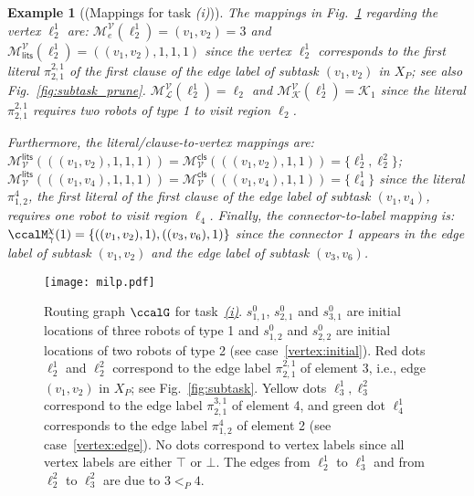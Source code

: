 \documentclass[Afour,sageh,times]{sagej}
\newtheorem{exmp}{Example}
\renewcommand{\ap}[3]{\mathcal{\pi}_{{#1},{#2}}^{#3}}
\newenvironment{cexmp}
{\addtocounter{exmp}{-1}\begin{exmp}}
  {\end{exmp}}
\begin{document}
\begin{cexmp}[(Mappings for task {\it (i)})]
    The mappings in Fig.~\ref{fig:milp} regarding the vertex $\ell_2^{1}$ are:
    $\mathcal{M}_e^{\mathcal{V}}(\ell_{2}^{1})  = (v_1,v_2) = 3$ and $\mathcal{M}_{\mathsf{lits}}^{\mathcal{V}}(\ell_{2}^{1})  = ((v_1,v_2), 1, 1, 1)$ since the vertex $\ell_2^{1}$ corresponds to the first literal $\ap{2}{1}{2,1}$ of the first clause of the edge label of subtask $(v_1, v_2)$ in $X_P$; see also Fig.~\ref{fig:subtask_prune}.  $\mathcal{M}_\mathcal{L}^{\mathcal{V}}(\ell_{2}^{1})  = \ell_2$  and $\mathcal{M}_\mathcal{K}^{\mathcal{V}}(\ell_{2}^{1})  = \mathcal{K}_1$ since the literal $\ap{2}{1}{2,1}$ requires two robots of type 1 to visit region $\ell_2$.

    Furthermore,  the literal/clause-to-vertex mappings are:
    $\mathcal{M}^{\mathsf{lits}}_{\mathcal{V}}(((v_1,v_2), 1, 1, 1)) = \mathcal{M}^{\mathsf{cls}}_{\mathcal{V}}(((v_1,v_2), 1, 1))  = \{\ell_2^{1}, \ell_2^{2}\}$; $\mathcal{M}^{\mathsf{lits}}_{\mathcal{V}}(((v_1,v_4), 1, 1, 1)) = \mathcal{M}^{\mathsf{cls}}_{\mathcal{V}}(((v_1,v_4), 1, 1))  = \{\ell_4^{1}\}$ since the literal $\ap{1}{2}{4}$, the first literal of the first clause of the edge label of subtask $(v_1, v_4)$, requires one robot to visit region $\ell_4$. Finally, the connector-to-label mapping is: $\ccalM^{\chi}_{\gamma} (1)  = \{((v_1, v_2), 1), ((v_3, v_6), 1)\}$ since the connector 1 appears in the edge label of subtask $(v_1 ,v_2)$ and the edge label of subtask $(v_3, v_6)$.
   \end{cexmp}
\begin{figure}[t]
  \centering
  \texttt{[image: milp.pdf]}
  \caption{Routing graph $\ccalG$ for task~\hyperref[task:i]{\it (i)}. $s^0_{1,1}$, $s^0_{2,1}$ and $s^0_{3,1}$ are initial locations of three robots of type 1 and $s^0_{1,2}$ and $s^0_{2,2}$ are initial locations of two robots of type 2 (see case~\ref{vertex:initial}). Red dots $\ell_{2}^{1}$ and $\ell_{2}^{2}$ correspond to the edge label $\ap{2}{1}{2,1}$ of element 3, i.e., edge $(v_1, v_2)$ in $X_P$; see Fig.~\ref{fig:subtask}. Yellow  dots $\ell_{3}^{1}, \ell_{3}^{2}$ correspond to the edge label $\ap{2}{1}{3,1}$ of element 4, and green dot $\ell_{4}^{1}$ corresponds to the edge label $\ap{1}{2}{4}$ of element 2 (see case~\ref{vertex:edge}). No dots correspond to vertex labels since all vertex labels are either $\top$ or $\bot$.  The edges from $\ell_2^{1}$ to $\ell_3^{1}$ and from $\ell_2^{2}$  to $\ell_3^{2}$ are due to $3 <_{P} 4$. }
    \label{fig:milp}
\end{figure}
\end{document}
